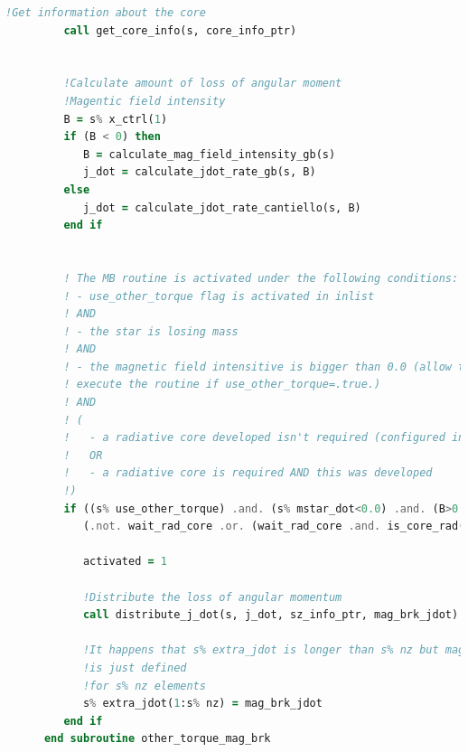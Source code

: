 \begin{lstlisting}[language=Fortran, caption={Rutina de frenado magnético.}, label={lst:torque_mb_hook}]
         !Get information about the core
         call get_core_info(s, core_info_ptr)


         !Calculate amount of loss of angular moment
         !Magentic field intensity
         B = s% x_ctrl(1)
         if (B < 0) then
            B = calculate_mag_field_intensity_gb(s)
            j_dot = calculate_jdot_rate_gb(s, B)
         else
            j_dot = calculate_jdot_rate_cantiello(s, B)
         end if
         

         ! The MB routine is activated under the following conditions:
         ! - use_other_torque flag is activated in inlist
         ! AND
         ! - the star is losing mass
         ! AND
         ! - the magnetic field intensitive is bigger than 0.0 (allow to 
         ! execute the routine if use_other_torque=.true.)
         ! AND
         ! (
         !   - a radiative core developed isn't required (configured in inlist)
         !   OR
         !   - a radiative core is required AND this was developed
         !)
         if ((s% use_other_torque) .and. (s% mstar_dot<0.0) .and. (B>0.0) .and. &
            (.not. wait_rad_core .or. (wait_rad_core .and. is_core_rad(s)))) then

            activated = 1

            !Distribute the loss of angular momentum
            call distribute_j_dot(s, j_dot, sz_info_ptr, mag_brk_jdot)

            !It happens that s% extra_jdot is longer than s% nz but mag_brk_jdot
            !is just defined
            !for s% nz elements
            s% extra_jdot(1:s% nz) = mag_brk_jdot
         end if
      end subroutine other_torque_mag_brk
\end{lstlisting}

\endinput

